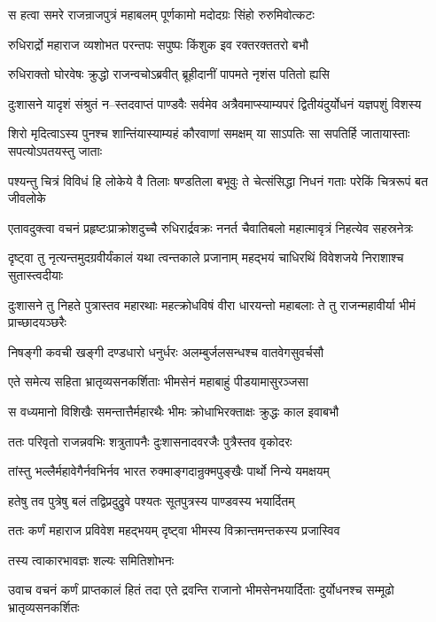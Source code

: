 \twolineshloka
{स हत्वा समरे राजन्राजपुत्रं महाबलम्}
{पूर्णकामो मदोदग्रः सिंहो रुरुमिवोत्कटः}


\twolineshloka
{रुधिरार्द्रो महाराज व्यशोभत परन्तपः}
{सपुष्पः किंशुक इव रक्तरक्ततरो बभौ}


\twolineshloka
{रुधिराक्तो घोरवेषः क्रुद्धो राजन्वचोऽब्रवीत्}
{ब्रूहीदानीं पापमते नृशंस पतितो ह्यसि}


\twolineshloka
{दुःशासने यादृशं संश्रुतं न--स्तदवाप्तं पाण्डवैः सर्वमेव}
{अत्रैवमाप्स्याम्यपरं द्वितीयंदुर्योधनं यज्ञपशुं विशस्य}


\twolineshloka
{शिरो मृदित्वाऽस्य पुनश्च शान्तिंयास्याम्यहं कौरवाणां समक्षम्}
{या साऽपतिः सा सपतिर्हि जातायास्ताः सपत्योऽपतयस्तु जाताः}


\twolineshloka
{पश्यन्तु चित्रं विविधं हि लोकेये वै तिलाः षण्डतिला बभूवुः}
{ते चेत्संसिद्धा निधनं गताः परेकिं चित्ररूपं बत जीवलोके}


\twolineshloka
{एतावदुक्त्वा वचनं प्रहृष्टःप्राक्रोशदुच्चै रुधिरार्द्रवक्रः}
{ननर्त चैवातिबलो महात्मावृत्रं निहत्येव सहस्रनेत्रः}


\twolineshloka
{दृष्ट्वा तु नृत्यन्तमुदग्रवीर्यंकालं यथा त्वन्तकाले प्रजानाम्}
{महद्भयं चाधिरथिं विवेशजये निराशाश्च सुतास्त्वदीयाः}


\threelineshloka
{दुःशासने तु निहते पुत्रास्तव महारथाः}
{महत्क्रोधविषं वीरा धारयन्तो महाबलाः}
{ते तु राजन्महावीर्या भीमं प्राच्छादयञ्छरैः}


\twolineshloka
{निषङ्गी कवची खङ्गी दण्डधारो धनुर्धरः}
{अलम्बुर्जलसन्धश्च वातवेगसुवर्चसौ}


\twolineshloka
{एते समेत्य सहिता भ्रातृव्यसनकर्शिताः}
{भीमसेनं महाबाहुं पीडयामासुरञ्जसा}


\twolineshloka
{स वध्यमानो विशिखैः समन्तात्तैर्महारथैः}
{भीमः क्रोधाभिरक्ताक्षः क्रुद्धः काल इवाबभौ}


\twolineshloka
{ततः परिवृतो राजन्नवभिः शत्रुतापनैः}
{दुःशासनादवरजैः पुत्रैस्तव वृकोदरः}


\twolineshloka
{तांस्तु भल्लैर्महावेगैर्नवभिर्नव भारत}
{रुक्माङ्गदान्रुक्मपुङ्खैः पार्थो निन्ये यमक्षयम्}


\twolineshloka
{हतेषु तव पुत्रेषु बलं तद्विप्रदुद्रुवे}
{पश्यतः सूतपुत्रस्य पाण्डवस्य भयार्दितम्}


\twolineshloka
{ततः कर्णं महाराज प्रविवेश महद्भयम्}
{दृष्ट्वा भीमस्य विक्रान्तमन्तकस्य प्रजास्विव}


\twolineshloka
{तस्य त्वाकारभावज्ञः शल्यः समितिशोभनः}
{}


उवाच वचनं कर्णं प्राप्तकालं हितं तदा
\twolineshloka
{एते द्रवन्ति राजानो भीमसेनभयार्दिताः}
{दुर्योधनश्च सम्मूढो भ्रातृव्यसनकर्शितः}


